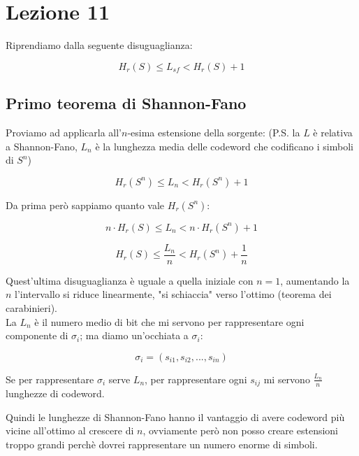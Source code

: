 \section*{Lezione 11}

Riprendiamo dalla seguente disuguaglianza:

\begin{equation*}
H_r(S) \leq L_{sf} < H_r(S) + 1
\end{equation*}

\subsection*{Primo teorema di Shannon-Fano}

Proviamo ad applicarla all'$n$-esima estensione della sorgente:
(P.S. la $L$ è relativa a Shannon-Fano, $L_n$ è la lunghezza media delle codeword che codificano i simboli di $S^n$)

\begin{equation*}
H_r(S^n) \leq L_{n} < H_r(S^n) + 1
\end{equation*}

Da prima però sappiamo quanto vale $H_r(S^n)$:

\begin{equation*}
n \cdot H_r(S) \leq L_{n} < n \cdot H_r(S^n) + 1
\end{equation*}

\begin{equation*}
H_r(S) \leq \frac{L_{n}}{n} < H_r(S^n) + \frac{1}{n}
\end{equation*}

Quest'ultima disuguaglianza è uguale a quella iniziale con $n=1$, aumentando la $n$ l'intervallo si riduce linearmente, "si schiaccia" verso l'ottimo (teorema dei carabinieri).\\

La $L_n$ è il numero medio di bit che mi servono per rappresentare ogni componente di $\sigma_i$; ma diamo un'occhiata a $\sigma_i$:

\begin{equation*}
\sigma_i= (s_{i1}, s_{i2}, ... , s_{in})
\end{equation*}

Se per rappresentare $\sigma_i$ serve $L_n$, per rappresentare ogni $s_{ij}$ mi servono $\frac{L_n}{n}$ lunghezze di codeword.

Quindi le lunghezze di Shannon-Fano hanno il vantaggio di avere codeword più vicine all'ottimo al crescere di $n$, ovviamente però non posso creare estensioni troppo grandi perchè dovrei rappresentare un numero enorme di simboli.

